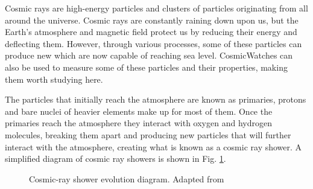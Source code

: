Cosmic rays are high-energy particles and clusters of particles originating from all around the universe. Cosmic rays are constantly raining down upon us, but the Earth's atmosphere and magnetic field protect us by reducing their energy and deflecting them. However, through various processes, some of these particles can produce new which are now capable of reaching sea level. CosmicWatches can also be used to measure some of these particles and their properties, making them worth studying here.

The particles that initially reach the atmosphere are known as primaries, protons and bare nuclei of heavier elements make up for most of them. Once the primaries reach the atmosphere they interact with oxygen and hydrogen molecules, breaking them apart and producing new particles that will further interact with the atmosphere, creating what is known as a cosmic ray shower. A simplified diagram of cosmic ray showers is shown in Fig. \ref{fig:cosmic-shower-diagram}.

\begin{figure}
\centering
{}
\caption{Cosmic-ray shower evolution diagram. Adapted from \cite{brunoRossi}}
\label{fig:cosmic-shower-diagram}
\end{figure}

